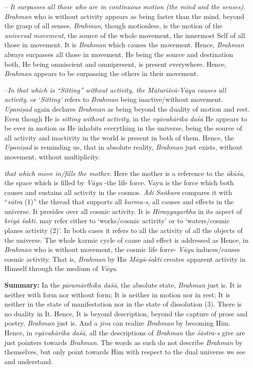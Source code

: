 -- \emph{It surpasses all those who are in continuous motion (the mind and the senses).} \emph{Brahman} who is without activity appears as being faster than the mind, beyond the grasp of all senses. \emph{Brahman}, though motionless, is the motion of the \emph{universal} \emph{movement}, the source of the whole movement, the innermost Self of all those in movement. It is \emph{Brahman} which causes the movement. Hence, \emph{Brahman} always surpasses all those in movement. He being the source and destination both, He being omniscient and omnipresent, is present everywhere. Hence, \emph{Brahman} appears to be surpassing the others in their movement.

 --\emph{In that which is ``Sitting'' without activity, the Mātariśvā-Vāyu causes all activity}.  or `\emph{Sitting'} refers to \emph{Brahman} being inactive/without movement. \emph{Upaniṣad} again declares \emph{Brahman} as being beyond the duality of motion and rest. Even though He is \emph{sitting without activity}, in the \emph{vyāvahārika} \emph{daśā} He appears to be ever in motion as He inhabits everything in the universe, being the source of all activity and inactivity in the world is present in both of them. Hence, the \emph{Upaniṣad} is reminding us, that in absolute reality, \emph{Brahman} just exists, without movement, without multiplicity.

 \emph{that which move in/fills the mother}. Here the mother is a reference to the \emph{ākāśa}, the space which is filled by \emph{Vāyu} -the life force. Vayu is the force which both causes and sustains all activity in the cosmos. \emph{Ādi Saṅkara} compares it with ``\emph{sūtra} (1)'' the thread that supports all \emph{karma-s}, all causes and effects in the universe. It presides over all cosmic activity. It is \emph{Hiraṇyagarbha} in its aspect of \emph{kriyā śakti}.  may refer either to `works/cosmic activity' or to `waters/cosmic planes activity (2)'. In both cases it refers to all the activity of all the objects of the universe. The whole karmic cycle of cause and effect is addressed as  Hence, in \emph{Brahman} who is without movement, the cosmic life force- \emph{Vāyu} induces/causes cosmic activity. That is, \emph{Brahman} by His \emph{Māyā}-\emph{śakti} creates apparent activity in Himself through the medium of \emph{Vāyu}.

\textbf{Summary:} In the \emph{pāramārthika daśā}, the absolute state, \emph{Brahman} just is. It is neither with form nor without form; It is neither in motion nor in rest; It is neither in the state of manifestation nor in the state of dissolution (3). There is no duality in It. Hence, It is beyond description, beyond the capture of prose and poetry. \emph{Brahman} just is. And a \emph{jīva} can realize \emph{Brahman} by becoming Him. Hence, in \emph{vyāvahārika daśā}, all the descriptions of \emph{Brahman} the \emph{śāstra-s} give are just pointers towards \emph{Brahman}. The words as such do not describe \emph{Brahman} by themselves, but only point towards Him with respect to the dual universe we see and understand.

